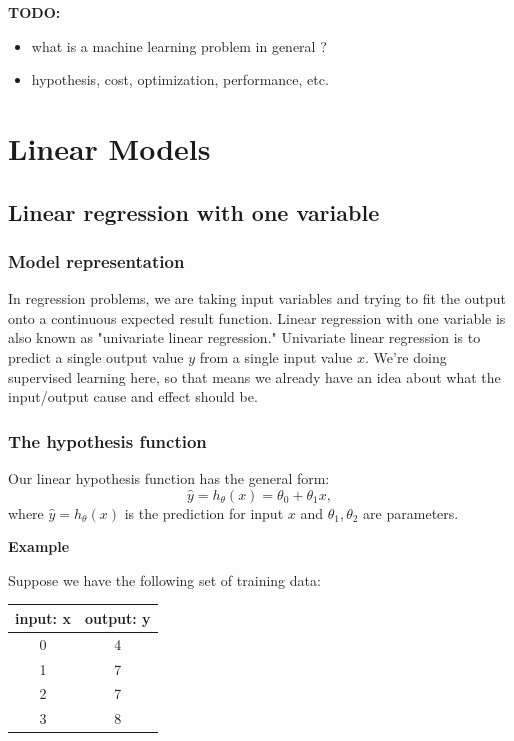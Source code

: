 \documentclass[a4paper,11pt]{report}
\begin{document}
\textbf{TODO:}
\begin{itemize}
  \item what is a machine learning problem in general ?
  \item hypothesis, cost, optimization, performance, etc.
\end{itemize}


\chapter{Linear Models}

\section{Linear regression with one variable}

\subsection*{Model representation}

In regression problems, we are taking input variables and trying to fit the output onto a continuous expected result function. Linear regression with one variable is also known as "univariate linear regression."
Univariate linear regression is to predict a single output value $y$ from a single input value $x$. We're doing supervised learning here, so that means we already have an idea about what the input/output cause and effect should be.

\subsection*{The hypothesis function}

Our linear hypothesis function has the general form:
\begin{equation}\label{eq:lin-reg-hyp}
\hat{y} = h_\theta(x) = \theta_0 + \theta_1x,
\end{equation}
where $\hat{y} = h_\theta(x)$ is the prediction for input $x$ and $\theta_1, \theta_2$ are parameters.

\textbf{Example}

Suppose we have the following set of training data:

\begin{center}
\begin{tabular}{ |c|c| }
 \hline
 input: x & output: y \\
 \hline
 0 & 4 \\ 1 & 7 \\ 2 & 7 \\ 3 & 8 \\
 \hline
\end{tabular}
\end{center}
\end{document}
